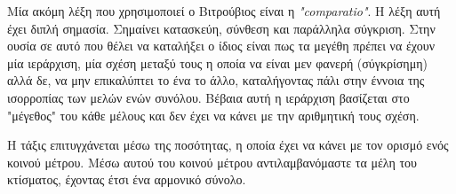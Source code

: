 Μία ακόμη λέξη που χρησιμοποιεί ο Βιτρούβιος είναι η \emph{"comparatio"}. Η λέξη αυτή έχει διπλή σημασία. Σημαίνει κατασκεύη, σύνθεση και παράλληλα σύγκριση. Στην ουσία σε αυτό που θέλει να καταλήξει ο ίδιος είναι πως τα μεγέθη πρέπει να έχουν μία ιεράρχιση, μία σχέση μεταξύ τους η οποία να είναι μεν φανερή (σύγκρίσημη) αλλά δε, να μην επικαλύπτει το ένα το άλλο, καταλήγοντας πάλι στην έννοια της ισορροπίας των μελών ενών συνόλου. Βέβαια αυτή η ιεράρχιση βασίζεται στο "μέγεθος" του κάθε μέλους και δεν έχει να κάνει με την αριθμητική τους σχέση. \cite[σ.~93,188]{vitruvius-lefas,lefas-fundamental}

Η τάξις επιτυγχάνεται μέσω της ποσότητας, η οποία έχει να κάνει με τον ορισμό ενός κοινού μέτρου. Μέσω αυτού του κοινού μέτρου αντιλαμβανόμαστε τα μέλη του κτίσματος, έχοντας έτσι ένα αρμονικό σύνολο. 









